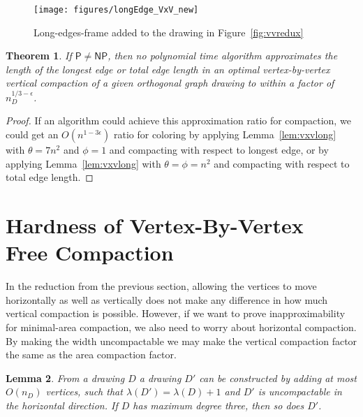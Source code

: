 \documentclass[12pt]{article}
\newtheorem{theorem}{Theorem}
\newtheorem{lemma}[theorem]{Lemma}
\theoremstyle{definitions}
\renewcommand{\P}{\mathsf{P}}
\newcommand{\NP}{\mathsf{NP}}
\begin{document}
\begin{figure}[t]
\centering
\texttt{[image: figures/longEdge\_VxV\_new]}
\caption{
\label{fig:longEdge_VxV}
Long-edges-frame added to the drawing in Figure~\ref{fig:vvredux}}
\end{figure}

\begin{theorem}
If $\P \neq \NP$, then no polynomial time algorithm approximates the length of the longest edge or total edge length in an optimal vertex-by-vertex vertical compaction of a given orthogonal graph drawing to within a factor of $n_D^{1/3 - \epsilon}$.
\end{theorem}
\begin{proof}
If an algorithm could achieve this approximation ratio for compaction, we could get an $O(n^{1-3\epsilon})$ ratio for coloring by applying Lemma~\ref{lem:vxvlong} with $\theta = 7n^2$ and $\phi = 1$ and compacting with respect to longest edge, or by applying Lemma~\ref{lem:vxvlong} with $\theta = \phi = n^2$ and compacting with respect to total edge length.
\end{proof}

\section{Hardness of Vertex-By-Vertex\\ Free Compaction}

In the reduction from the previous section, allowing the vertices to move horizontally as well as vertically does not make any difference in how much vertical compaction is possible. However, if we want to prove inapproximability for minimal-area compaction, we also need to worry about horizontal compaction.
By making the width uncompactable we may make the vertical compaction factor the same
as the area compaction factor.

\begin{lemma}
\label{lem:fixbar}
From a drawing $D$ a drawing $D'$ can be constructed by adding at most
$O(n_D)$ vertices, such that $\lambda(D') = \lambda(D) + 1$ and $D'$ is
uncompactable in the horizontal direction. If $D$ has maximum degree three, then so does $D'$.
\end{lemma}
\end{document}
